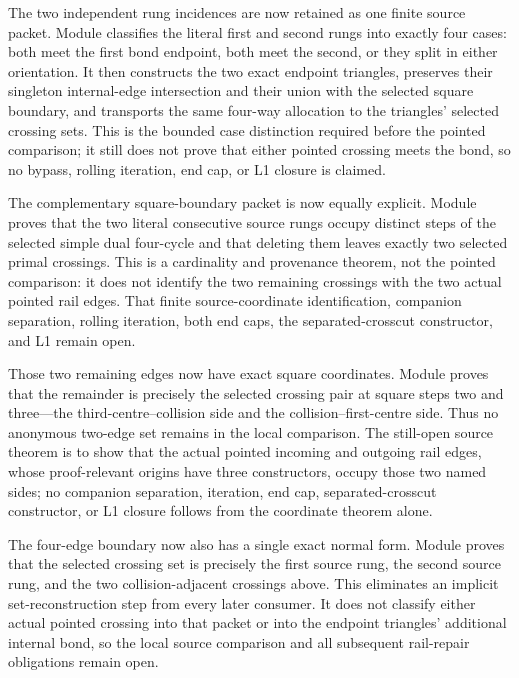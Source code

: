 \documentclass[11pt]{article}
\theoremstyle{definition}
\begin{document}
The two independent rung incidences are now retained as one finite source
packet.  Module
classifies the literal first and second rungs into exactly four cases: both
meet the first bond endpoint, both meet the second, or they split in either
orientation.  It then constructs the two exact endpoint triangles, preserves
their singleton internal-edge intersection and their union with the selected
square boundary, and transports the same four-way allocation to the triangles'
selected crossing sets.  This is the bounded case distinction required before
the pointed comparison; it still does not prove that either pointed crossing
meets the bond, so no bypass, rolling iteration, end cap, or L1 closure is
claimed.

The complementary square-boundary packet is now equally explicit.  Module
proves that the two literal consecutive source rungs occupy distinct steps of
the selected simple dual four-cycle and that deleting them leaves exactly two
selected primal crossings.  This is a cardinality and provenance theorem, not
the pointed comparison: it does not identify the two remaining crossings with
the two actual pointed rail edges.  That finite source-coordinate
identification, companion separation, rolling iteration, both end caps, the
separated-crosscut constructor, and L1 remain open.

Those two remaining edges now have exact square coordinates.  Module
proves that the remainder is precisely the selected crossing pair at square
steps two and three---the third-centre--collision side and the
collision--first-centre side.  Thus no anonymous two-edge set remains in the
local comparison.  The still-open source theorem is to show that the actual
pointed incoming and outgoing rail edges, whose proof-relevant origins have
three constructors, occupy those two named sides; no companion separation,
iteration, end cap, separated-crosscut constructor, or L1 closure follows
from the coordinate theorem alone.

The four-edge boundary now also has a single exact normal form.  Module
proves that the selected crossing set is precisely the first source rung, the
second source rung, and the two collision-adjacent crossings above.  This
eliminates an implicit set-reconstruction step from every later consumer.  It
does not classify either actual pointed crossing into that packet or into the
endpoint triangles' additional internal bond, so the local source comparison
and all subsequent rail-repair obligations remain open.
\end{document}
